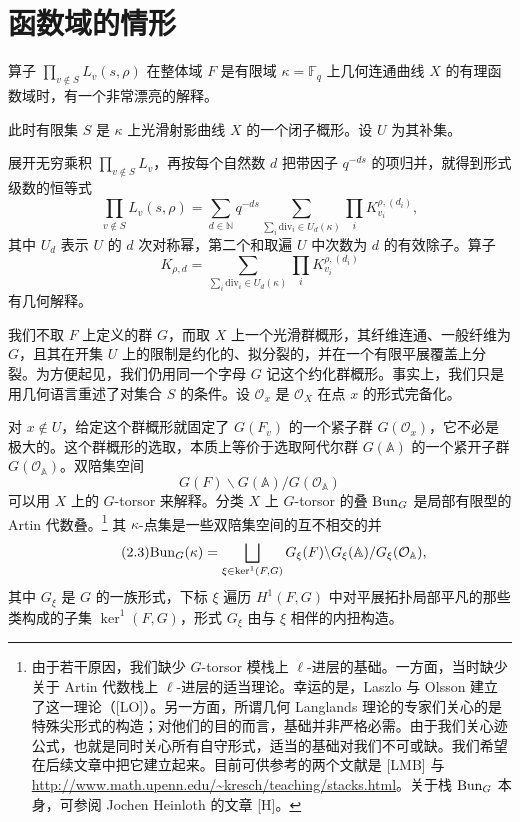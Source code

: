 \section{函数域的情形}

算子 $\prod_{v\notin S}L_v(s,\rho)$ 在整体域 $F$ 是有限域 $\kappa=\mathbb F_q$ 上几何连通曲线 $X$ 的有理函数域时，有一个非常漂亮的解释。

此时有限集 $S$ 是 $\kappa$ 上光滑射影曲线 $X$ 的一个闭子概形。设 $U$ 为其补集。

展开无穷乘积 $\prod_{v\notin S}L_v$，再按每个自然数 $d$ 把带因子 $q^{-ds}$ 的项归并，就得到形式级数的恒等式
\begin{equation}\tag{2.1}
\prod_{v\notin S}L_v(s,\rho)
=\sum_{d\in\mathbb N}q^{-ds}
\sum_{\sum_i\mathrm{div}_i\in U_d(\kappa)}\prod_i K^{\rho,(d_i)}_{v_i},
\end{equation}
其中 $U_d$ 表示 $U$ 的 $d$ 次对称幂，第二个和取遍 $U$ 中次数为 $d$ 的有效除子。算子
\begin{equation}\tag{2.2}
K_{\rho,d}=\sum_{\sum_i\mathrm{div}_i\in U_d(\kappa)}\prod_i K^{\rho,(d_i)}_{v_i}
\end{equation}
有几何解释。

我们不取 $F$ 上定义的群 $G$，而取 $X$ 上一个光滑群概形，其纤维连通、一般纤维为 $G$，且其在开集 $U$ 上的限制是约化的、拟分裂的，并在一个有限平展覆盖上分裂。为方便起见，我们仍用同一个字母 $G$ 记这个约化群概形。事实上，我们只是用几何语言重述了对集合 $S$ 的条件。设 $\mathcal O_x$ 是 $\mathcal O_X$ 在点 $x$ 的形式完备化。

对 $x\notin U$，给定这个群概形就固定了 $G(F_v)$ 的一个紧子群 $G(\mathcal O_x)$，它不必是极大的。这个群概形的选取，本质上等价于选取阿代尔群 $G(\mathbb A)$ 的一个紧开子群 $G(\mathcal O_{\mathbb A})$。双陪集空间
\[
G(F)\backslash G(\mathbb A)/G(\mathcal O_{\mathbb A})
\]
可以用 $X$ 上的 $G$-torsor 来解释。分类 $X$ 上 $G$-torsor 的叠 $\mathrm{Bun}_G$ 是局部有限型的 Artin 代数叠。\footnote{由于若干原因，我们缺少 $G$-torsor 模栈上 $\ell$-进层的基础。一方面，当时缺少关于 Artin 代数栈上 $\ell$-进层的适当理论。幸运的是，Laszlo 与 Olsson 建立了这一理论（[LO]）。另一方面，所谓几何 Langlands 理论的专家们关心的是特殊尖形式的构造；对他们的目的而言，基础并非严格必需。由于我们关心迹公式，也就是同时关心所有自守形式，适当的基础对我们不可或缺。我们希望在后续文章中把它建立起来。目前可供参考的两个文献是 [LMB] 与 \url{http://www.math.upenn.edu/~kresch/teaching/stacks.html}。关于栈 $\mathrm{Bun}_G$ 本身，可参阅 Jochen Heinloth 的文章 [H]。} 其 $\kappa$-点集是一些双陪集空间的互不相交的并
\begin{equation}\tag{2.3}
\mathrm{Bun}_G(\kappa)=\bigsqcup_{\xi\in\ker^1(F,G)}G_\xi(F)\backslash G_\xi(\mathbb A)/G_\xi(\mathcal O_{\mathbb A}),
\end{equation}
其中 $G_\xi$ 是 $G$ 的一族形式，下标 $\xi$ 遍历 $H^1(F,G)$ 中对平展拓扑局部平凡的那些类构成的子集 $\ker^1(F,G)$，形式 $G_\xi$ 由与 $\xi$ 相伴的内扭构造。

